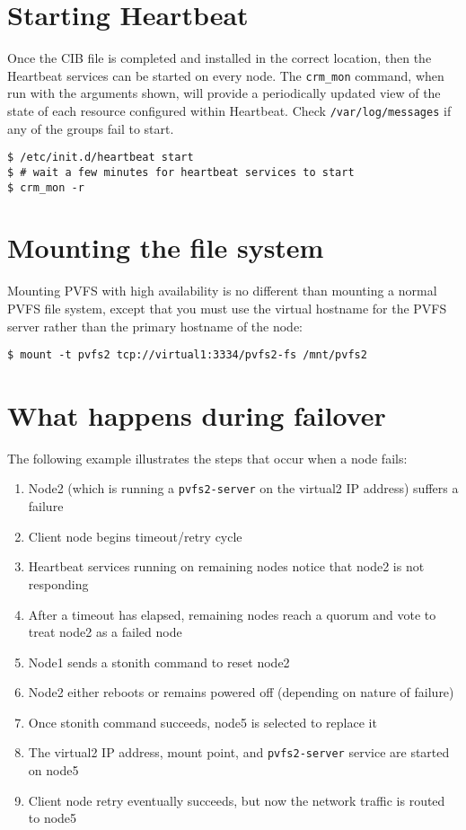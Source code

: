 \documentclass[11pt]{article}
\begin{document}
\section{Starting Heartbeat}

Once the CIB file is completed and installed in the correct
location, then the Heartbeat services can be started on every node.
The \texttt{crm\_mon} command, when run with the arguments shown,
will provide a periodically updated view of the state of each resource
configured within Heartbeat.  Check \texttt{/var/log/messages} if any
of the groups fail to start.

\begin{verbatim}
$ /etc/init.d/heartbeat start
$ # wait a few minutes for heartbeat services to start
$ crm_mon -r
\end{verbatim}

\section{Mounting the file system}

Mounting PVFS with high availability is no different than mounting a
normal PVFS file system, except that you must use the virtual hostname
for the PVFS server rather than the primary hostname of the node:

\begin{verbatim}
$ mount -t pvfs2 tcp://virtual1:3334/pvfs2-fs /mnt/pvfs2
\end{verbatim}

\section{What happens during failover}

The following example illustrates the steps that occur when a node fails:

\begin{enumerate}
\item Node2 (which is running a \texttt{pvfs2-server} on the virtual2 IP
address) suffers a failure
\item Client node begins timeout/retry cycle
\item Heartbeat services running on remaining nodes notice that node2
is not responding
\item After a timeout has elapsed, remaining nodes reach a quorum and
vote to treat node2 as a failed node
\item Node1 sends a stonith command to reset node2
\item Node2 either reboots or remains powered off (depending on nature
of failure)
\item Once stonith command succeeds, node5 is selected to replace it
\item The virtual2 IP address, mount point, and
\texttt{pvfs2-server} service
are started on node5
\item Client node retry eventually succeeds, but now the network
traffic is routed to node5
\end{enumerate}
\end{document}
